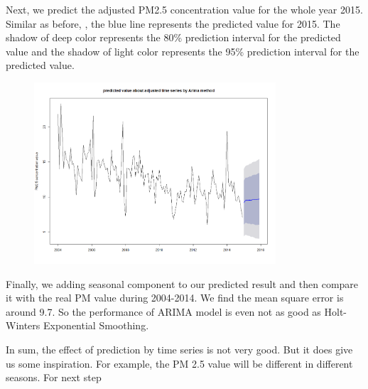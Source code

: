 Next, we predict the adjusted PM2.5 concentration value for the whole year 2015. Similar as before, , the blue line represents the predicted value for 2015. The shadow of deep color represents the 80\% prediction interval for the predicted value and the shadow of light color represents the 95\% prediction interval for the predicted value.

\begin{figure}[ht!]
\centering
\includegraphics[width = 90mm]{ts6.png}
\end{figure}

Finally, we adding seasonal component to our predicted result and then compare it with the real PM value during 2004-2014. We find the mean square error is around 9.7. So the performance of ARIMA model is even not as good as Holt-Winters Exponential Smoothing.

In sum, the effect of prediction by time series is not very good. But it does give us some inspiration. For example, the PM 2.5 value will be different in different seasons. For next step

















